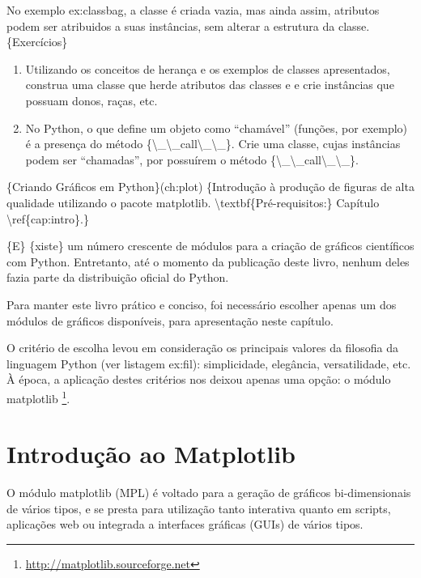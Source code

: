 \documentclass[a4paper,10pt,brazil]{sphinxmanual}
\begin{document}
No exemplo ex:classbag, a classe  é criada vazia, mas
ainda assim, atributos podem ser atribuidos a suas instâncias, sem
alterar a estrutura da classe. \{Exercícios\}
\begin{enumerate}
\item {} 
Utilizando os conceitos de herança e os exemplos de classes
apresentados, construa uma classe  que herde atributos
das classes  e  e crie instâncias que
possuam donos, raças, etc.

\item {} 
No Python, o que define um objeto como ``chamável'' (funções, por
exemplo) é a presença do método \{\textbackslash{}\_\textbackslash{}\_call\textbackslash{}\_\textbackslash{}\_\}. Crie uma
classe, cujas instâncias podem ser ``chamadas'', por possuírem o
método \{\textbackslash{}\_\textbackslash{}\_call\textbackslash{}\_\textbackslash{}\_\}.

\end{enumerate}

\{Criando Gráficos em Python\}(ch:plot)
\{Introdução à produção de figuras de alta qualidade utilizando o pacote matplotlib. \textbackslash{}textbf\{Pré-requisitos:\} Capítulo \textbackslash{}ref\{cap:intro\}.\}

\{E\} \{xiste\} um número crescente de módulos para a criação de
gráficos científicos com Python. Entretanto, até o momento da
publicação deste livro, nenhum deles fazia parte da distribuição
oficial do Python.

Para manter este livro prático e conciso, foi necessário escolher
apenas um dos módulos de gráficos disponíveis, para apresentação
neste capítulo.

O critério de escolha levou em consideração os principais valores
da filosofia da linguagem Python (ver listagem ex:fil):
simplicidade, elegância, versatilidade, etc. À época, a aplicação
destes critérios nos deixou apenas uma opção: o módulo
matplotlib \footnote{
\href{http://matplotlib.sourceforge.net}{http://matplotlib.sourceforge.net}
}.


\chapter{Introdução ao Matplotlib}
\label{Capplot:introducao-ao-matplotlib}\label{Capplot::doc}
O módulo matplotlib (MPL) é voltado para a geração de gráficos
bi-dimensionais de vários tipos, e se presta para utilização tanto
interativa quanto em scripts, aplicações web ou integrada a
interfaces gráficas (GUIs) de vários tipos.
\end{document}
